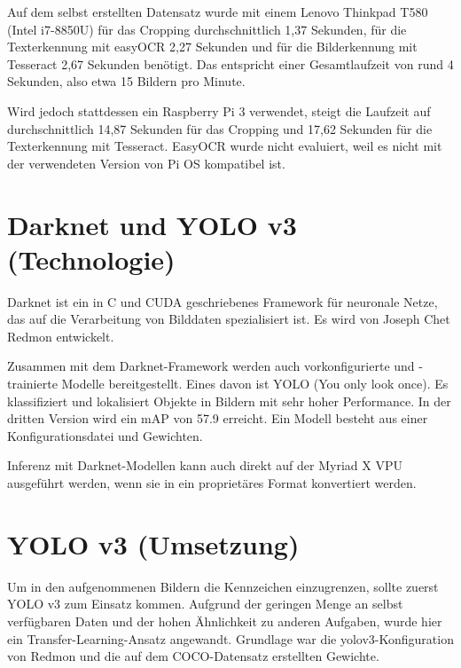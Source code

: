 Auf dem selbst erstellten Datensatz wurde mit einem Lenovo Thinkpad T580 (Intel i7-8850U) für das Cropping durchschnittlich 1,37 Sekunden,
für die Texterkennung mit easyOCR 2,27 Sekunden und für die Bilderkennung mit Tesseract 2,67 Sekunden benötigt.
Das entspricht einer Gesamtlaufzeit von rund 4 Sekunden, also etwa 15 Bildern pro Minute.

Wird jedoch stattdessen ein Raspberry Pi 3 verwendet, steigt die Laufzeit auf durchschnittlich 14,87 Sekunden für das Cropping und 17,62 Sekunden für die Texterkennung mit Tesseract.
EasyOCR wurde nicht evaluiert, weil es nicht mit der verwendeten Version von Pi OS kompatibel ist.


\section{Darknet und YOLO v3 (Technologie)}
	
	Darknet ist ein in C und CUDA geschriebenes Framework für neuronale Netze, das auf die Verarbeitung von Bilddaten spezialisiert ist. Es wird von Joseph Chet Redmon entwickelt. \autocite{darknet13}
	
	Zusammen mit dem Darknet-Framework werden auch vorkonfigurierte und -trainierte Modelle bereitgestellt. Eines davon ist YOLO (You only look once). Es klassifiziert und lokalisiert Objekte in Bildern mit sehr hoher Performance. In der dritten Version wird ein mAP von 57.9 erreicht. Ein Modell besteht aus einer Konfigurationsdatei und Gewichten. \autocite{yolov3}
	
	Inferenz mit Darknet-Modellen kann auch direkt auf der Myriad X VPU ausgeführt werden, wenn sie in ein proprietäres Format konvertiert werden.
	
	
\section{YOLO v3 (Umsetzung)}

Um in den aufgenommenen Bildern die Kennzeichen einzugrenzen, sollte zuerst YOLO v3 zum Einsatz kommen. Aufgrund der geringen Menge an selbst verfügbaren Daten und der hohen Ähnlichkeit zu anderen Aufgaben, wurde hier ein Transfer-Learning-Ansatz angewandt. Grundlage war die yolov3-Konfiguration von Redmon und die auf dem COCO-Datensatz erstellten Gewichte.

